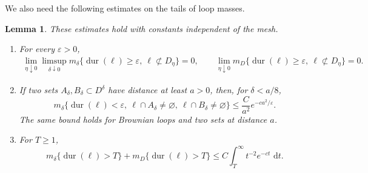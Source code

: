 \documentclass[11pt]{article}
\numberwithin{equation}{section}
\newcommand{\1}{\mathbf{1}}
\newtheorem{lemma}[theorem]{Lemma}
\newcommand{\dd}{\,\mathrm d}
\begin{document}
We also need the following estimates on the tails of loop masses.
\begin{lemma}
\label{lem:loop-mass-estimates}
These estimates hold with
constants independent of the mesh.
\begin{enumerate}
\item For every \(\varepsilon>0\),
\begin{align*}
 \lim_{\eta\downarrow0}\limsup_{\delta\downarrow0}
 m_\delta\{\operatorname{dur}(\ell)\geq\varepsilon,\
       \ell\not\subset D_\eta\}=0,\qquad
 \lim_{\eta\downarrow0}
 m_D\{\operatorname{dur}(\ell)\geq\varepsilon,\
       \ell\not\subset D_\eta\}=0.
\end{align*}
\item If two sets \(A_\delta,B_\delta\subset D^\delta\) have distance at
least \(a>0\), then, for \(\delta<a/8\),
\begin{equation}
 m_\delta\{\operatorname{dur}(\ell)<\varepsilon,\
       \ell\cap A_\delta\ne\varnothing,\ \ell\cap B_\delta\ne\varnothing\}
 \leq \frac C{a^2}e^{-ca^2/\varepsilon}.
\end{equation}
The same bound holds for Brownian loops and two sets at distance \(a\).
\item For \(T\geq1\),
\begin{equation}
 m_\delta\{\operatorname{dur}(\ell)>T\}
 +m_D\{\operatorname{dur}(\ell)>T\}
 \leq C\int_T^\infty t^{-2}e^{-ct}\,\dd t .
\end{equation}
\end{enumerate}
\end{lemma}
\end{document}
